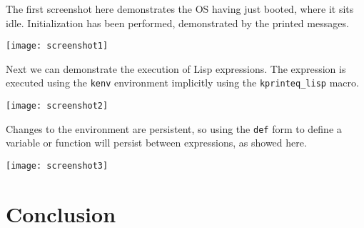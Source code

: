 \documentclass[10pt]{report}
\begin{document}
The first screenshot here demonstrates the OS having just booted, where it sits idle. Initialization has been performed, demonstrated by the printed messages.

\texttt{[image: screenshot1]}

Next we can demonstrate the execution of Lisp expressions. The expression is executed using the \texttt{kenv} environment implicitly using the \texttt{kprinteq_lisp} macro.

\texttt{[image: screenshot2]}

Changes to the environment are persistent, so using the \texttt{def} form to define a variable or function will persist between expressions, as showed here.

\texttt{[image: screenshot3]}

\chapter{Conclusion}
\end{document}
